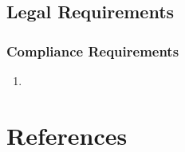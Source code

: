 \documentclass[english]{article}
\begin{document}
\subsection{Legal Requirements}
\label{sub:legal_requirements}

\subsubsection{Compliance Requirements}
\label{ssub:compliance_requirements}
\begin{enumerate}[{LCR}1. ]
	\item
\end{enumerate}


\section{References}
\label{sub:references}


\end{document}
